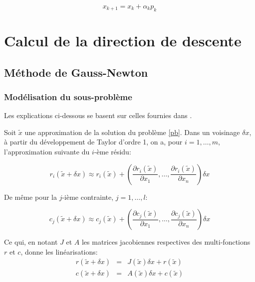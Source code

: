 \documentclass[a4paper,11pt]{article}
\numberwithin{equation}{section}
\begin{document}
\begin{equation}
x_{k+1} = x_{k}+\alpha_{k}p_{k}
\end{equation}
 
\section{Calcul de la direction de descente}



\subsection{Méthode de Gauss-Newton} \label{method:gn}
\subsubsection{Modélisation du sous-problème} \label{gn:model}

Les explications ci-dessous se basent sur celles fournies dans \cite{lindstromwedin1988}.

Soit $\tilde{x}$ une approximation de la solution du problème \ref{pb}. Dans un voisinage $\delta x$, à partir du développement de Taylor d'ordre 1, on a, pour $i=1,\ldots,m$, l'approximation suivante du $i$-ème résidu:

\begin{equation}
r_{i}(\tilde{x} + \delta x) \approx r_{i}(\tilde{x}) + \left(\dfrac{\partial r_{i}(\tilde{x})}{\partial x_{1}}, \ldots, \dfrac{\partial r_{i}(\tilde{x})}{\partial x_{n}}\right)\delta x 
\end{equation}

De même pour la $j$-ième contrainte, $j=1,\ldots,l$: 

\begin{equation}
c_{j}(\tilde{x} + \delta x) \approx c_{j}(\tilde{x}) + \left(\dfrac{\partial c_{j}(\tilde{x})}{\partial x_{1}}, \ldots, \dfrac{\partial c_{j}(\tilde{x})}{\partial x_{n}}\right)\delta x 
\end{equation}

Ce qui, en notant $J$ et $A$ les matrices jacobiennes respectives des multi-fonctions $r$ et $c$, donne les linéarisations:
\begin{eqnarray} 
r(\tilde{x}+\delta x) &=& J(\tilde{x})\delta x + r(\tilde{x}) \label{linearisationr}\\
c(\tilde{x}+\delta x) &=& A(\tilde{x})\delta x + c(\tilde{x}) \label{linearisationc}
\end{eqnarray}
\end{document}
